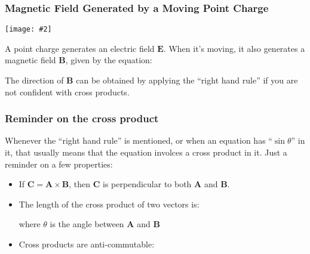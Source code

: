\documentclass[12pt,aspectratio=169]{beamer}
\newcommand{\pic}[2]{\texttt{[image: \#2]}}
\newcommand{\mb}[1]{\mathbf{#1}}
\newcommand{\eq}[2]{\vspace{#1}{\Large\begin{displaymath}#2\end{displaymath}}}
\begin{document}
\begin{frame}
  \frametitle{Magnetic Field Generated by a Moving Point Charge}
  \begin{center}
    \pic{.35}{pointchargeB.png}
  \end{center}
  
  A point charge generates an electric field $\mb{E}$. When it's moving, it
  also generates a magnetic field $\mb{B}$, given by the equation:

  \eq{-.2in}{
    \boxed{\mb{B}=\frac{\mu_0}{4\pi}\frac{q\mb{v}\times\hat{\mb{r}}}{r^2}}
  }

  The direction of $\mb{B}$ can be obtained by applying the ``right hand rule''
  if you are not confident with cross products.
\end{frame}

\begin{frame}
  \frametitle{Reminder on the cross product}
  Whenever the ``right hand rule'' is mentioned, or when an equation has
  ``$\sin\theta$'' in it, that usually means that the equation involces a
  cross product in it. Just a reminder on a few properties:
  \begin{itemize}
  \item If $\mb{C}=\mb{A}\times\mb{B}$, then $\mb{C}$ is perpendicular to both
    $\mb{A}$ and $\mb{B}$.
  \item The length of the cross product of two vectors is:
    
    \eq{-.3in}{
      |\mb{A}\times\mb{B}|=|\mb{A}||\mb{B}|\sin\theta
    }
    where $\theta$ is the angle between $\mb{A}$ and $\mb{B}$
  \item Cross products are anti-commutable:

    \eq{-.35in}{
      \mb{A}\times\mb{B}=-\mb{B}\times\mb{A}
    }
  \end{itemize}
\end{frame}
\end{document}
